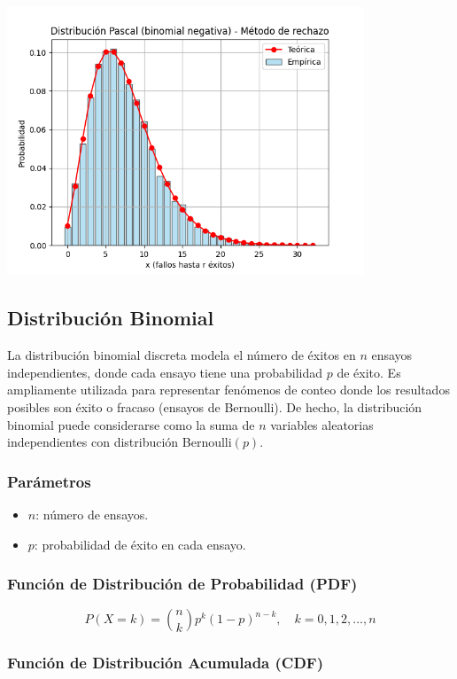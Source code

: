\documentclass{article}
\begin{document}
\begin{center}
    \includegraphics[width=0.8\textwidth]{visualizaciones/pascal_rechazo.png}
\end{center}


\subsection{Distribución Binomial}

La distribución binomial discreta modela el número de éxitos en $n$ ensayos independientes, donde cada ensayo tiene una probabilidad $p$ de éxito. Es ampliamente utilizada para representar fenómenos de conteo donde los resultados posibles son éxito o fracaso (ensayos de Bernoulli). De hecho, la distribución binomial puede considerarse como la suma de $n$ variables aleatorias independientes con distribución Bernoulli$(p)$.

\subsubsection*{Parámetros}
\begin{itemize}
  \item $n$: número de ensayos.
  \item $p$: probabilidad de éxito en cada ensayo.
\end{itemize}

\subsubsection*{Función de Distribución de Probabilidad (PDF)}
\[
P(X = k) = \binom{n}{k} p^k (1-p)^{n-k}, \quad k = 0, 1, 2, ..., n
\]

\subsubsection*{Función de Distribución Acumulada (CDF)}
\end{document}
